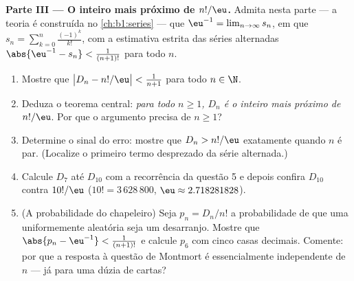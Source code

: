 \begin{problem}
\medskip
\noindent\textbf{Parte III --- O inteiro mais próximo de
$n!/\eu$.} Admita nesta parte --- a teoria é construída no
\cref{ch:b1:series} --- que
$\eu^{-1} = \lim_{n \to \infty} s_n$, em que $s_n = \sum_{k=0}^{n}
\frac{(-1)^k}{k!}$, com a estimativa estrita das séries alternadas
$\abs{\eu^{-1} - s_n} < \frac1{(n+1)!}$ para todo $n$.
\begin{enumerate}
  \item Mostre que $\bigl| D_n - n!/\eu \bigr| < \frac1{n+1}$ para
        todo $n \in \N$.
  \item Deduza o teorema central: \emph{para todo $n \geq 1$,
        $D_n$ é o inteiro mais próximo de $n!/\eu$}. Por que o
        argumento precisa de $n \geq 1$?
  \item Determine o sinal do erro: mostre que $D_n > n!/\eu$
        exatamente quando $n$ é par. (Localize o primeiro termo
        desprezado da série alternada.)
  \item Calcule $D_7$ até $D_{10}$ com a recorrência da
        questão 5 e depois confira $D_{10}$ contra $10!/\eu$
        ($10! = 3\,628\,800$, $\eu \approx 2.718281828$).
  \item (A probabilidade do chapeleiro) Seja $p_n = D_n/n!$ a
        probabilidade de que uma  uniformemente aleatória seja
        um desarranjo. Mostre que $\abs{p_n - \eu^{-1}} < \frac1{(n+1)!}$
        e calcule $p_6$ com cinco casas decimais. Comente: por que a
        resposta à questão de Montmort é essencialmente independente
        de $n$ --- já para uma dúzia de cartas?
\end{enumerate}


\end{problem}
